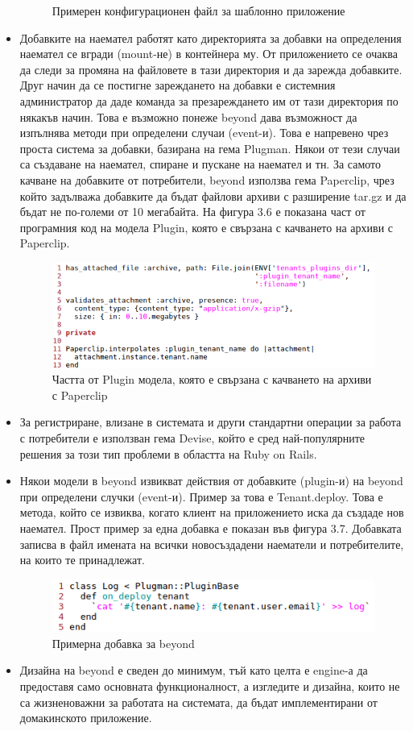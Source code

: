 \documentclass[pdftex,14pt,a4paper]{extreport}
\begin{document}
\begin{itemize}
\begin{figure}[H]
    \caption{Примерен конфигурационен файл за шаблонно приложение}
  \end{figure}
\item Добавките на наемател работят като директорията за добавки на определения наемател се вгради (mount-не) в контейнера му. От приложението се очаква да следи за промяна на файловете в тази директория и да зарежда добавките. Друг начин да се постигне зареждането на добавки е системния администратор да даде команда за презареждането им от тази директория по някакъв начин. Това е възможно понеже beyond дава възможност да изпълнява методи при определени случаи (event-и). Това е напревено чрез проста система за добавки, базирана на гема Plugman. Някои от тези случаи са създаване на наемател, спиране и пускане на наемател и тн. За самото качване на добавките от потребители, beyond използва гема Paperclip, чрез който задълважа добавките да бъдат файлови архиви с разширение tar.gz и да бъдат не по-големи от 10 мегабайта. На фигура 3.6 е показана част от програмния код на модела Plugin, която е свързана с качването на архиви с Paperclip.
  \begin{figure}[H]
    \centering
    \includegraphics[scale=0.8]{./snippets/plugin_archive}
    \caption{Частта от Plugin модела, която е свързана с качването на архиви с Paperclip}
  \end{figure}
  \item За регистриране, влизане в системата и други стандартни операции за работа с потребители е използван гема Devise, който е сред най-популярните решения за този тип проблеми в областта на Ruby on Rails.
  \item Някои модели в beyond извикват действия от добавките (plugin-и) на beyond при определени случки (event-и). Пример за това е Tenant.deploy. Това е метода, който се извиква, когато клиент на приложението иска да създаде нов наемател. Прост пример за една добавка е показан във фигура 3.7. Добавката записва в файл имената на всички новосъздадени наематели и потребителите, на които те принадлежат.
  \begin{figure}[H]
    \centering
    \includegraphics[scale=0.8]{./snippets/beyond_plugin}
    \caption{Примерна добавка за beyond}
  \end{figure}
  \item Дизайна на beyond е сведен до минимум, тъй като целта е engine-а да предоставя само основната функционалност, а изгледите и дизайна, които не са жизненоважни за работата на системата, да бъдат имплементирани от домакинското приложение.
\end{itemize}
\end{document}

